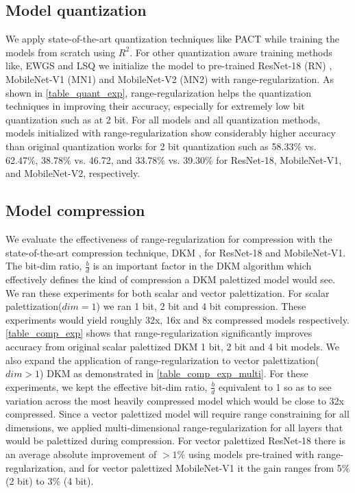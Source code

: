 \documentclass[10pt,twocolumn,letterpaper]{article}
\begin{document}
\subsection{Model quantization}
We apply state-of-the-art quantization techniques like PACT \cite{choi2018pact} while training the models from scratch using $R^2$. For other quantization aware training methods like, EWGS \cite{lee2021network} and LSQ \cite{esser2019learned} we initialize the model to pre-trained ResNet-18 (RN) \cite{he2016deep}, MobileNet-V1 (MN1) \cite{howard2017mobilenets} and MobileNet-V2 (MN2) \cite{sandler2018mobilenetv2} with range-regularization. As shown in \cref{table_quant_exp}, range-regularization helps the quantization techniques in improving their accuracy, especially for extremely low bit quantization such as at 2 bit. For all models and all quantization methods, models initialized with range-regularization show considerably higher accuracy than original quantization works for 2 bit quantization such as 58.33\% vs. 62.47\%, 38.78\% vs. 46.72, and 33.78\% vs. 39.30\% for ResNet-18, MobileNet-V1, and MobileNet-V2, respectively.


\subsection{Model compression}
We evaluate the effectiveness of range-regularization for compression with the state-of-the-art compression technique, DKM \cite{cho2021dkm}, for ResNet-18 and MobileNet-V1. The bit-dim ratio, $\frac{b}{d}$ is an important factor in the DKM algorithm which effectively defines the kind of compression a DKM palettized model would see. We ran these experiments for both scalar and vector palettization. For scalar palettization($dim=1$) we ran 1 bit, 2 bit and 4 bit compression. These experiments would yield roughly 32x, 16x and 8x compressed models respectively. \cref{table_comp_exp} shows that range-regularization significantly improves accuracy from original scalar palettized DKM 1 bit, 2 bit and 4 bit models. We also expand the application of range-regularization to vector palettization($dim>1$) DKM \cite{cho2021dkm} as demonstrated in \cref{table_comp_exp_multi}. For these experiments, we kept the effective bit-dim ratio, $\frac{b}{d}$ equivalent to 1 so as to see variation across the most heavily compressed model which would be close to 32x compressed. Since a vector palettized model will require range constraining for all dimensions, we applied multi-dimensional range-regularization for all layers that would be palettized during compression. For vector palettized ResNet-18 there is an average absolute improvement of $>1\%$ using models pre-trained with range-regularization, and for vector palettized MobileNet-V1 it the gain ranges from 5\%(2 bit) to 3\% (4 bit). 
\end{document}
